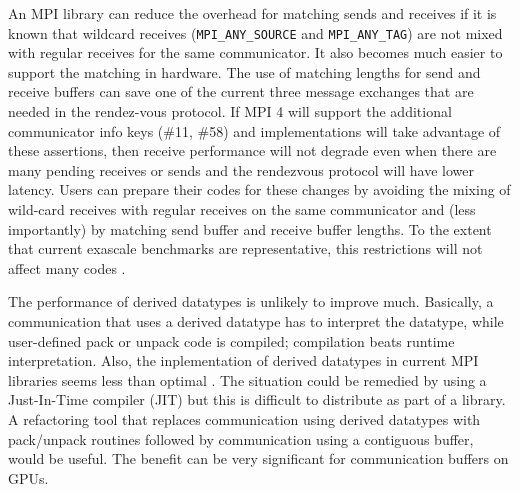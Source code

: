 An MPI library can reduce the overhead for matching sends and receives if it is 
known  that wildcard receives (\texttt{MPI\_ANY\_SOURCE} and 
\texttt{MPI\_ANY\_TAG}) are not mixed with regular receives for the same 
communicator. It also becomes much easier to support 
the matching in hardware. The use of matching lengths for send and receive 
buffers can save one of the current three message exchanges that are needed in 
the rendez-vous protocol. If MPI 4 will support the additional communicator 
info keys (\#11, \#58) and implementations will take advantage of these 
assertions, 
then receive performance will not degrade even when there are many pending 
receives or sends and the rendezvous protocol will have lower latency. Users 
can prepare their codes for these changes by avoiding 
the mixing of wild-card receives with regular receives on the same communicator 
and (less importantly) by matching send buffer and receive buffer lengths. To 
the extent that 
current exascale benchmarks are representative, this restrictions will not 
affect many codes \cite{klenk2017overview}.

The performance of derived datatypes is unlikely to improve much. Basically, 
a communication that uses a derived datatype has to interpret the datatype, 
while 
user-defined pack or unpack code is compiled; compilation beats runtime 
interpretation. Also, the inplementation of derived datatypes in current MPI 
libraries seems less than optimal \cite{carpen2017expected}. The situation 
could 
be remedied by 
using a Just-In-Time 
compiler (JIT) but this is difficult to distribute as part of a library. A 
refactoring tool that replaces communication using derived datatypes with 
pack/unpack routines followed by communication using a contiguous buffer, 
would be useful. The benefit can be very significant for communication buffers 
on GPUs.

